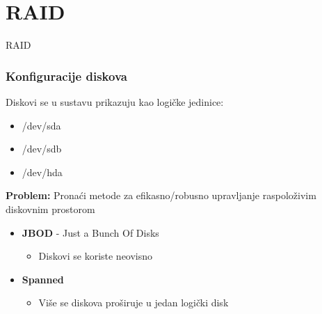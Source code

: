 \documentclass[t]{beamer}
\begin{document}
\section{RAID}

\begin{frame}
	\vspace*{\fill}
		\begin{center}
			\Huge{RAID}
		\end{center}
	\vspace*{\fill}
\end{frame}

\begin{frame}
	\frametitle{Konfiguracije diskova}
	Diskovi se u sustavu prikazuju kao logičke jedinice:
	{\ttfamily
		\begin{itemize}
			\item[] /dev/sda
			\item[] /dev/sdb
			\item[] /dev/hda
		\end{itemize}
	}
	\textbf{Problem:} Pronaći metode za efikasno/robusno upravljanje raspoloživim diskovnim prostorom
	\vfill
	\begin{itemize}
		\item \textbf{JBOD} - Just a Bunch Of Disks
		\begin{itemize}
			\item Diskovi se koriste neovisno
		\end{itemize}
		\item \textbf{Spanned}
		\begin{itemize}
			\item Više se diskova proširuje u jedan logički disk
		\end{itemize}
	\end{itemize}
\end{frame}
\end{document}
